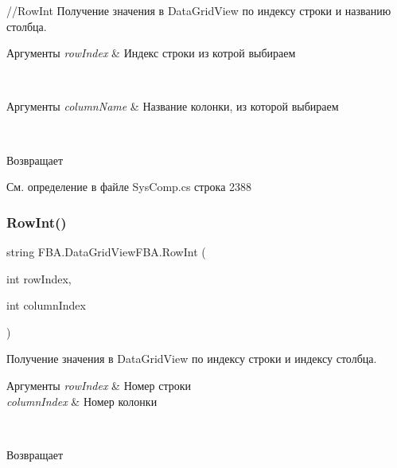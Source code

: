 //\+Row\+Int Получение значения в Data\+Grid\+View по индексу строки и названию столбца. 


\begin{DoxyParams}{Аргументы}
{\em row\+Index} & Индекс строки из котрой выбираем\\
\hline
\end{DoxyParams}
~\newline

\begin{DoxyParams}{Аргументы}
{\em column\+Name} & Название колонки, из которой выбираем\\
\hline
\end{DoxyParams}
~\newline
\begin{DoxyReturn}{Возвращает}

\end{DoxyReturn}


См. определение в файле Sys\+Comp.\+cs строка 2388

\mbox{\label{class_f_b_a_1_1_data_grid_view_f_b_a_a75a3a34be8a2a52927dd0fe9f7ec1b9e}} 
\subsubsection{\texorpdfstring{Row\+Int()}{RowInt()}\hspace{0.1cm}{\footnotesize\ttfamily [2/2]}}
{\footnotesize\ttfamily string F\+B\+A.\+Data\+Grid\+View\+F\+B\+A.\+Row\+Int (\begin{DoxyParamCaption}\item[{int}]{row\+Index,  }\item[{int}]{column\+Index }\end{DoxyParamCaption})}



Получение значения в Data\+Grid\+View по индексу строки и индексу столбца. 


\begin{DoxyParams}{Аргументы}
{\em row\+Index} & Номер строки\\
\hline
{\em column\+Index} & Номер колонки\\
\hline
\end{DoxyParams}
~\newline
\begin{DoxyReturn}{Возвращает}

\end{DoxyReturn}


